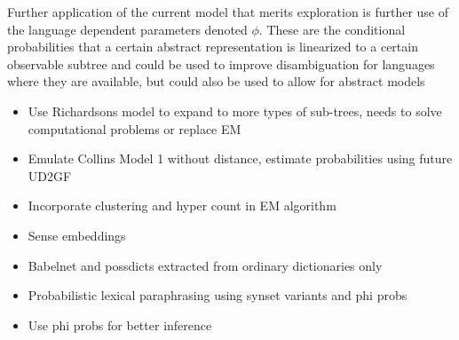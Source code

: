 Further application of the current model that merits exploration is further use of the language dependent parameters denoted $\phi$. These are the conditional probabilities that a certain abstract representation is linearized to a certain observable subtree and could be used to improve disambiguation for languages where they are available, but could also be used to allow for abstract models 
\begin{itemize}
    \item Use Richardsons model to expand to more types of sub-trees, needs to solve computational problems or replace EM
    \item Emulate Collins Model 1 without distance, estimate probabilities using future UD2GF
    \item Incorporate clustering and hyper count in EM algorithm
    \item Sense embeddings
    \item Babelnet and possdicts extracted from ordinary dictionaries only
    \item Probabilistic lexical paraphrasing using synset variants and phi probs
    \item Use phi probs for better inference
\end{itemize}
